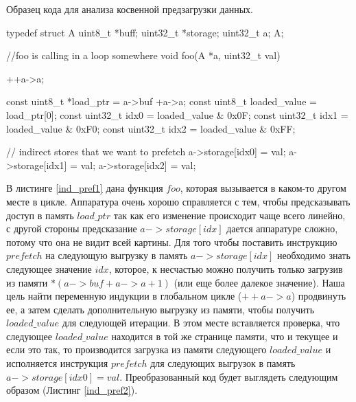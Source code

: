   \begin{ListingEnv}[!h]
 	\captiondelim{ } %
 	\caption{Образец кода для анализа косвенной предзагрузки данных.}\label{ind_pref1}
 	
 	\begin{Verb}
 	typedef struct A
 	{
 		uint8_t *buff;
 		uint32_t *storage;
 		uint32_t a;
 	} A;
 	
 	//foo is calling in a loop somewhere
 	void foo(A *a, uint32_t val)
 	{
 		++a->a;
 		
 		const uint8_t *load_ptr = a->buf +a->a;
 		const uint8_t loaded_value  = load_ptr[0];
 		const uint32_t idx0 = loaded_value & 0x0F;
 		const uint32_t idx1 = loaded_value & 0xF0;
 		const uint32_t idx2 = loaded_value & 0xFF;
 		
 		// indirect stores that we want to prefetch
 		a->storage[idx0] = val;
 		a->storage[idx1] = val;
 		a->storage[idx2] = val;
 	}
 	\end{Verb}
 \end{ListingEnv}
 
  В листинге \ref{ind_pref1} дана функция $foo$, которая вызывается в каком-то другом месте в цикле. Аппаратура очень хорошо справляется с тем, чтобы предсказывать доступ в память $load\_ptr$ так как его изменение происходит чаще всего линейно, с другой стороны предсказание $a->storage[idx]$ дается аппаратуре сложно, потому что она не видит всей картины. Для того чтобы поставить инструкцию $prefetch$ на следующую выгрузку в память $a->storage[idx]$ необходимо знать следующее значение $idx$, которое, к несчастью можно получить только загрузив из памяти $*(a->buf +a->a +1)$ (или еще более далекое значение). Наша цель найти переменную индукции в глобальном цикле ($++a->a$) продвинуть ее, а затем сделать дополнительную выгрузку из памяти, чтобы получить $loaded\_value$ для следующей итерации. В этом месте вставляется проверка, что следующее $loaded\_value$ находится в той же странице памяти, что и текущее и если это так, то производится загрузка из памяти следующего $loaded\_value$ и исполняется инструкция $prefetch$ для следующих выгрузок в память $a->storage[idx0] = val$. Преобразованный код будет выглядеть следующим образом (Листинг \ref{ind_pref2}).
  
